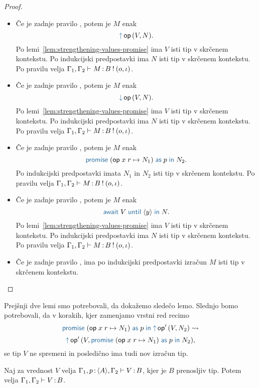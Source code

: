 \begin{proof}
\begin{itemize}
		\item Če je zadnje pravilo , potem je $M$ enak $$\tmopout{op}{V}{N}.$$
		Po lemi~\ref{lem:strengthening-values-promise} ima $V$ isti tip v skrčenem kontekstu.
		Po indukcijski predpostavki ima $N$ isti tip v skrčenem kontekstu.
		Po pravilu  velja $\Gamma_1, \Gamma_2 \vdash M \mathinner{:} B \mathbin{!} (o, \iota)$.
		
		\item Če je zadnje pravilo , potem je $M$ enak $$\tmopin{op}{V}{N}.$$
		Po lemi~\ref{lem:strengthening-values-promise} ima $V$ isti tip v skrčenem kontekstu.
		Po indukcijski predpostavki ima $N$ isti tip v skrčenem kontekstu.
		Po pravilu  velja $\Gamma_1, \Gamma_2 \vdash M \mathinner{:} B \mathbin{!} (o, \iota)$.
		
		\item Če je zadnje pravilo , potem je $M$ enak $$\tmwithrec{op}{x}{r}{N_1}{p}{N_2}.$$
		Po indukcijski predpostavki imata $N_1$ in $N_2$ isti tip v skrčenem kontekstu.
		Po pravilu  velja $\Gamma_1, \Gamma_2 \vdash M \mathinner{:} B \mathbin{!} (o, \iota)$.
		
		\item Če je zadnje pravilo , potem je $M$ enak $$\tmawait{V}{y}{N}.$$
		Po lemi~\ref{lem:strengthening-values-promise} ima $V$ isti tip v skrčenem kontekstu.
		Po indukcijski predpostavki ima $N$ isti tip v skrčenem kontekstu.
		Po pravilu  velja $\Gamma_1, \Gamma_2 \vdash M \mathinner{:} B \mathbin{!} (o, \iota)$.
		
		\item Če je zadnje pravilo , ima po indukcijski predpostavki izračun $M$ isti tip v skrčenem kontekstu.
		
	\end{itemize}
\end{proof}

Prejšnji dve lemi smo potrebovali, da dokažemo sledečo lemo. Slednjo bomo potrebovali, da v korakih, kjer zamenjamo vrstni red recimo $$\tmwithrec{op}{x}{r}{N_1}{p}{\tmopout{op'}{V}{N_2}} \reduces $$ $$\tmopout{op'}{V}{\tmwithrec{op}{x}{r}{N_1}{p}{N_2}},$$ se tip $V$ ne spremeni in posledično ima tudi nov izračun tip.

\begin{lema}\label{lem:tovor-osnovni-tip-skrcitev-2}
	Naj za vrednost $V$ velja $\Gamma_1, p \mathinner{:} \langle A \rangle, \Gamma_2 \vdash V \mathinner{:} B$, kjer je $B$ prenosljiv tip. Potem velja $\Gamma_1, \Gamma_2 \vdash V \mathinner{:} B$.
\end{lema}

